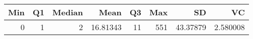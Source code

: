 
\begin{tabular}[t]{rrrrrrrr}
\toprule
Min & Q1 & Median & Mean & Q3 & Max & SD & VC\\
\midrule
0 & 1 & 2 & 16.81343 & 11 & 551 & 43.37879 & 2.580008\\
\bottomrule
\end{tabular}